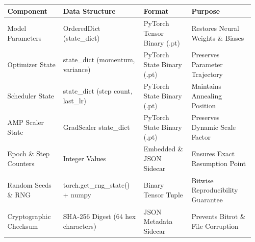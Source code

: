 \begin{tabular}{llll}
\toprule
Component & Data Structure & Format & Purpose \\
\midrule
Model Parameters & OrderedDict (state\_dict) & PyTorch Tensor Binary (.pt) & Restores Neural Weights \& Biases \\
Optimizer State & state\_dict (momentum, variance) & PyTorch State Binary (.pt) & Preserves Parameter Trajectory \\
Scheduler State & state\_dict (step count, last\_lr) & PyTorch State Binary (.pt) & Maintains Annealing Position \\
AMP Scaler State & GradScaler state\_dict & PyTorch State Binary (.pt) & Preserves Dynamic Scale Factor \\
Epoch \& Step Counters & Integer Values & Embedded \& JSON Sidecar & Ensures Exact Resumption Point \\
Random Seeds \& RNG & torch.get\_rng\_state() + numpy & Binary Tensor Tuple & Bitwise Reproducibility Guarantee \\
Cryptographic Checksum & SHA-256 Digest (64 hex characters) & JSON Metadata Sidecar & Prevents Bitrot \& File Corruption \\
\bottomrule
\end{tabular}

